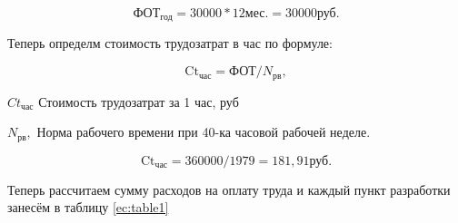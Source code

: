 \begin{equation*}
    \text{ФОТ}_\text{год} = 30 000 * 12 \text{мес.} = 30 000 \text{руб.}
\end{equation*}

Теперь определм стоимость трудозатрат в час по формуле:

\begin{equation}
    \text{Ct}_\text{час} = \text{ФОТ} / N_\text{рв},
\end{equation}

\begin{eqexpl}[25mm]
    \item{$Ct_\text{час}$} Стоимость трудозатрат за 1 час, руб
    \item{$N_\text{рв},$} Норма рабочего времени при 40-ка часовой рабочей
неделе.
\end{eqexpl}

\begin{equation*}
    \text{Ct}_\text{час} = 360 000 / 1979 = 181,91 \text{руб}.
\end{equation*}

Теперь рассчитаем сумму расходов на оплату труда и каждый пункт
разработки занесём в таблицу \ref{ec:table1}

